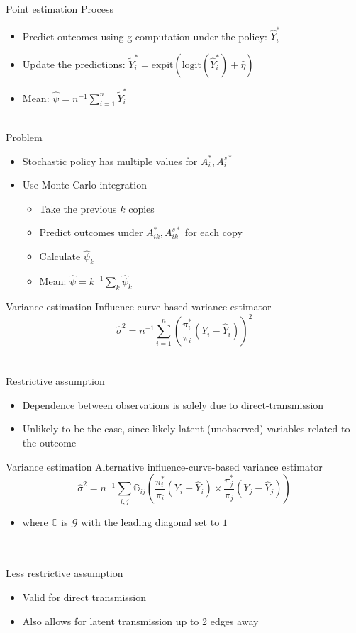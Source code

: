 \documentclass{beamer}
\begin{document}
\begin{frame}{Point estimation}
	Process
	\begin{itemize}
		\item Predict outcomes using g-computation under the policy: $\hat{Y}_i^*$
		\item Update the predictions: $\tilde{Y}_i^* = \text{expit}(\text{logit}(\hat{Y}_i^*) + \hat{\eta})$
		\item Mean: $\hat{\psi} = n^{-1} \sum_{i=1}^n \tilde{Y}_i^*$
	\end{itemize}~\\
	Problem
	\begin{itemize}
		\item Stochastic policy has multiple values for $A_i^*,A_i^{s*}$
		\item Use Monte Carlo integration
		\begin{itemize}
			\item Take the previous $k$ copies
			\item Predict outcomes under $A_{ik}^*,A_{ik}^{s*}$ for each copy
			\item Calculate $\hat{\psi}_k$
			\item Mean: $\hat{\psi} = k^{-1} \sum_k \hat{\psi}_k$
		\end{itemize}
	\end{itemize}
\end{frame}

\begin{frame}{Variance estimation}
	Influence-curve-based variance estimator
	\[\hat{\sigma}^2 = n^{-1} \sum_{i=1}^n \left(\frac{\pi^*_i}{\pi_i} (Y_i - \hat{Y}_i) \right)^2\]~\\~\\
	Restrictive assumption
	\begin{itemize}
		\item Dependence between observations is solely due to direct-transmission
		\item Unlikely to be the case, since likely latent (unobserved) variables related to the outcome
	\end{itemize}
\end{frame}

\begin{frame}{Variance estimation}
	Alternative influence-curve-based variance estimator
	\[\hat{\sigma}^2 = n^{-1} \sum_{i,j} \mathbb{G}_{ij} \left(\frac{\pi^*_i}{\pi_i} (Y_i - \hat{Y}_i) \times \frac{\pi^*_j}{\pi_j} (Y_j - \hat{Y}_j) \right) \]
	\begin{itemize}
		\item where $\mathbb{G}$ is $\mathcal{G}$ with the leading diagonal set to $1$
	\end{itemize}~\\~\\
	Less restrictive assumption
	\begin{itemize}
		\item Valid for direct transmission
		\item Also allows for latent transmission up to 2 edges away
	\end{itemize}
\end{frame}
\end{document}
